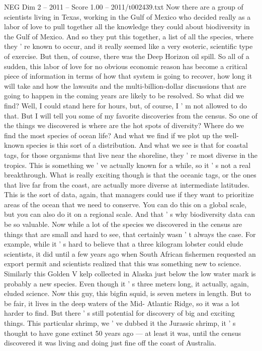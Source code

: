 \begin{textsample}{NEG Dim 2 – 2011 – Score 1.00 – 2011/t002439.txt}
Now there are a group of scientists living in Texas, working in the Gulf of Mexico who decided really as a labor of love to pull together all the knowledge they could about biodiversity in the Gulf of Mexico.
And so they put this together, a list of all the species, where they ' re known to occur, and it really seemed like a very esoteric, scientific type of exercise.
But then, of course, there was the Deep Horizon oil spill.
So all of a sudden, this labor of love for no obvious economic reason has become a critical piece of information in terms of how that system is going to recover, how long it will take and how the lawsuits and the multi-billion-dollar discussions that are going to happen in the coming years are likely to be resolved.
So what did we find?
Well, I could stand here for hours, but, of course, I ' m not allowed to do that.
But I will tell you some of my favorite discoveries from the census.
So one of the things we discovered is where are the hot spots of diversity?
Where do we find the most species of ocean life?
And what we find if we plot up the well-known species is this sort of a distribution.
And what we see is that for coastal tags, for those organisms that live near the shoreline, they ' re most diverse in the tropics.
This is something we ' ve actually known for a while, so it ' s not a real breakthrough.
What is really exciting though is that the oceanic tags, or the ones that live far from the coast, are actually more diverse at intermediate latitudes.
This is the sort of data, again, that managers could use if they want to prioritize areas of the ocean that we need to conserve.
You can do this on a global scale, but you can also do it on a regional scale.
And that ' s why biodiversity data can be so valuable.
Now while a lot of the species we discovered in the census are things that are small and hard to see, that certainly wasn ' t always the case.
For example, while it ' s hard to believe that a three kilogram lobster could elude scientists, it did until a few years ago when South African fishermen requested an export permit and scientists realized that this was something new to science.
Similarly this Golden V kelp collected in Alaska just below the low water mark is probably a new species.
Even though it ' s three meters long, it actually, again, eluded science.
Now this guy, this bigfin squid, is seven meters in length.
But to be fair, it lives in the deep waters of the Mid- Atlantic Ridge, so it was a lot harder to find.
But there ' s still potential for discovery of big and exciting things.
This particular shrimp, we ' ve dubbed it the Jurassic shrimp, it ' s thought to have gone extinct 50 years ago — at least it was, until the census discovered it was living and doing just fine off the coast of Australia.

\end{textsample}
